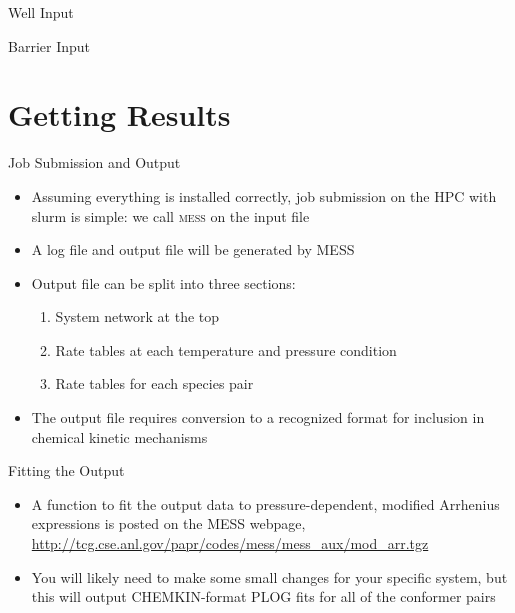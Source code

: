 \documentclass[10pt,presentation]{beamer}
\begin{document}
\begin{frame}[fragile]{Well Input}
  \vspace{-0.8cm}
  \tiny{
  
  }
\end{frame}

\begin{frame}[fragile]{Barrier Input}
  \vspace{-0.8cm}
  \tiny{
  
  }
\end{frame}


\section{Getting Results}
\begin{frame}{Job Submission and Output}
  \begin{itemize}
   \item Assuming everything is installed correctly, job submission on the HPC with slurm is simple: we call \textsc{mess} on the input file
   \item A log file and output file will be generated by \textsc{MESS}
   \item Output file can be split into three sections:
    \begin{enumerate}
     \item System network at the top
     \item Rate tables at each temperature and pressure condition
     \item Rate tables for each species pair
    \end{enumerate}
   \item The output file requires conversion to a recognized format for inclusion in chemical kinetic mechanisms
  \end{itemize}
\end{frame}

\begin{frame}{Fitting the Output}
  \begin{itemize}
   \item A function to fit the output data to pressure-dependent, modified Arrhenius expressions is posted on the \textsc{MESS} webpage, \url{http://tcg.cse.anl.gov/papr/codes/mess/mess_aux/mod_arr.tgz}
   \item You will likely need to make some small changes for your specific system, but this will output \textsc{CHEMKIN}-format \textsc{PLOG} fits for all of the conformer pairs
  \end{itemize}
\end{frame}
\end{document}
